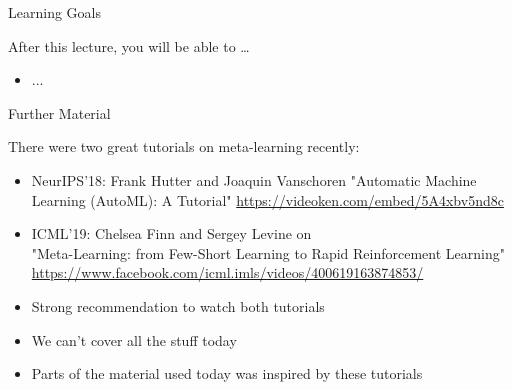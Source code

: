 \begin{frame}[c]{Learning Goals}

After this lecture, you will be able to \ldots

\begin{itemize}
	\item ...
\end{itemize}

\end{frame}
\begin{frame}[c]{Further Material}

There were two great tutorials on meta-learning recently:

\begin{itemize}
	\item NeurIPS'18: Frank Hutter and Joaquin Vanschoren
	"Automatic Machine Learning (AutoML): A Tutorial"
	\url{https://videoken.com/embed/5A4xbv5nd8c}
	\item ICML'19: Chelsea Finn and Sergey Levine on\\
	"Meta-Learning: from Few-Short Learning to Rapid Reinforcement Learning"\\
	\url{https://www.facebook.com/icml.imls/videos/400619163874853/}
\end{itemize}

\begin{itemize}
	\item Strong recommendation to watch both tutorials
	\item We can't cover all the stuff today
	\item Parts of the material used today was inspired by these tutorials
\end{itemize}


\end{frame}
